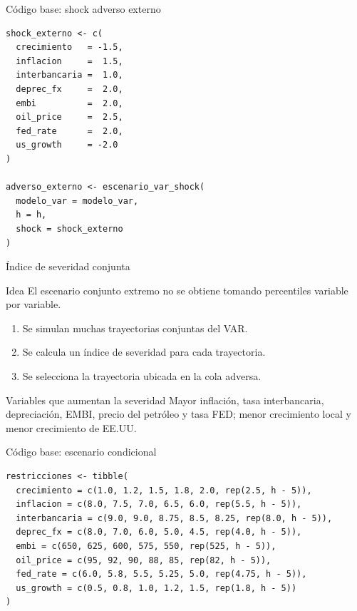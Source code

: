 \begin{frame}[fragile]{Código base: shock adverso externo}

\small

\begin{verbatim}
shock_externo <- c(
  crecimiento   = -1.5,
  inflacion     =  1.5,
  interbancaria =  1.0,
  deprec_fx     =  2.0,
  embi          =  2.0,
  oil_price     =  2.5,
  fed_rate      =  2.0,
  us_growth     = -2.0
)

adverso_externo <- escenario_var_shock(
  modelo_var = modelo_var,
  h = h,
  shock = shock_externo
)
\end{verbatim}

\end{frame}

\begin{frame}{Índice de severidad conjunta}

\begin{block}{Idea}
El escenario conjunto extremo no se obtiene tomando percentiles variable por variable.
\end{block}

\begin{enumerate}
    \item Se simulan muchas trayectorias conjuntas del VAR.
    \item Se calcula un índice de severidad para cada trayectoria.
    \item Se selecciona la trayectoria ubicada en la cola adversa.
\end{enumerate}

\vspace{0.5em}

\begin{alertblock}{Variables que aumentan la severidad}
Mayor inflación, tasa interbancaria, depreciación, EMBI, precio del petróleo y tasa FED; menor crecimiento local y menor crecimiento de EE.UU.
\end{alertblock}

\end{frame}

\begin{frame}[fragile]{Código base: escenario condicional}

\small

\begin{verbatim}
restricciones <- tibble(
  crecimiento = c(1.0, 1.2, 1.5, 1.8, 2.0, rep(2.5, h - 5)),
  inflacion = c(8.0, 7.5, 7.0, 6.5, 6.0, rep(5.5, h - 5)),
  interbancaria = c(9.0, 9.0, 8.75, 8.5, 8.25, rep(8.0, h - 5)),
  deprec_fx = c(8.0, 7.0, 6.0, 5.0, 4.5, rep(4.0, h - 5)),
  embi = c(650, 625, 600, 575, 550, rep(525, h - 5)),
  oil_price = c(95, 92, 90, 88, 85, rep(82, h - 5)),
  fed_rate = c(6.0, 5.8, 5.5, 5.25, 5.0, rep(4.75, h - 5)),
  us_growth = c(0.5, 0.8, 1.0, 1.2, 1.5, rep(1.8, h - 5))
)
\end{verbatim}

\end{frame}

